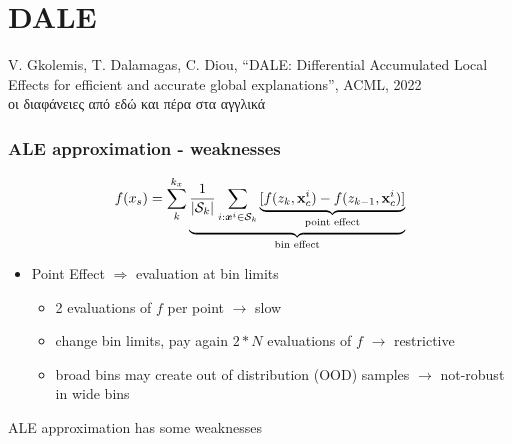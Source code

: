 \section{DALE}

\begin{frame}[plain,c]
  \Large V. Gkolemis, T. Dalamagas, C. Diou, ``DALE: Differential Accumulated
  Local Effects for efficient and accurate global explanations'', ACML, 2022
  \\
  \normalsize{οι διαφάνειες από εδώ και πέρα στα αγγλικά}
\end{frame}


\begin{frame}
  \frametitle{ALE approximation - weaknesses}

  \begin{equation*}
    f(x_s) = \sum_k^{k_x} \underbrace{\frac{1}{|\mathcal{S}_k|} \sum_{i:\boldsymbol{x}^i
        \in \mathcal{S}_k} \underbrace{[f(z_k, \mathbf{x}^i_c) - f(z_{k-1},
          \mathbf{x}^i_c)]}_{\text{point effect}}}_{\text{bin effect}}
  \end{equation*}

  \begin{itemize}
  \item Point Effect \(\Rightarrow\) evaluation \alert{at bin limits}
    \begin{itemize}
    \item 2 evaluations of \(f\) per point \( \rightarrow \) slow
    \item change bin limits, pay again \(2*N\) evaluations of \(f\) \( \rightarrow\) restrictive
    \item broad bins may create out of distribution (OOD) samples \( \rightarrow\) not-robust in wide bins
    \end{itemize}
  \end{itemize}

  \noindent\makebox[\linewidth]{\rule{\paperwidth}{0.4pt}}
  ALE approximation has some weaknesses
\end{frame}


